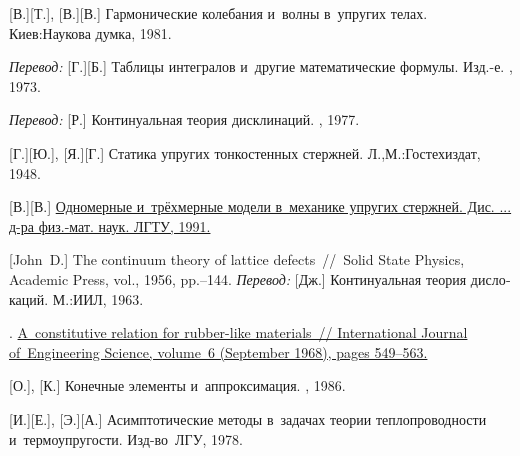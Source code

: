 \begin{thebibliography}{123}
\begin{otherlanguage}{russian}
[В.][Т.], [В.][В.] Гармонические колебания и~волны в~упругих телах. Киев:\;Наукова думка, 1981. 

\emph{Перевод:} [Г.][Б.] Таблицы интегралов и~другие математические формулы. Изд.\hbox{-}е. \naukapublisher, 1973. 


\emph{Перевод:} [Р.] Континуальная теория дисклинаций. \mirpublisher, 1977. 

[Г.][Ю.], [Я.][Г.] Статика упругих тонкостенных стержней. Л.,\:М.:\;Гостехиздат, 1948. 

[В.][В.] \href{https://www.researchgate.net/publication/320895320_Odnomernye_i_trehmernye_modeli_v_mehanike_uprugih_sterznej}{Одномерные и~трёхмерные модели в~механике упругих стержней. Дис. ... д\hbox{-}ра физ.\hbox{-}мат. наук. ЛГТУ, 1991.} 

[John~D.] The continuum theory of lattice defects~//~Solid State Physics, Academic Press, vol., 1956, pp.\hbox{--}144.
\emph{Перевод:} [Дж.] Континуальная теория дислокаций. М.:\;ИИЛ, 1963. 

. \href{https://kundoc.com/pdf-a-constitutive-relation-for-rubber-like-materials-.html}{A~constitutive relation for rubber-like materials~// International Journal of~Engineering Science, volume~6 (September 1968), pages 549\hbox{--}563.}

[О.], [К.] Конечные элементы и~аппроксимация. \mirpublisher, 1986. 

[И.][Е.], [Э.][А.] Асимптотические методы в~задачах теории теплопроводности и~термоупругости. Изд\hbox{-}во~ЛГУ, 1978. 


\end{otherlanguage}
\end{thebibliography}
